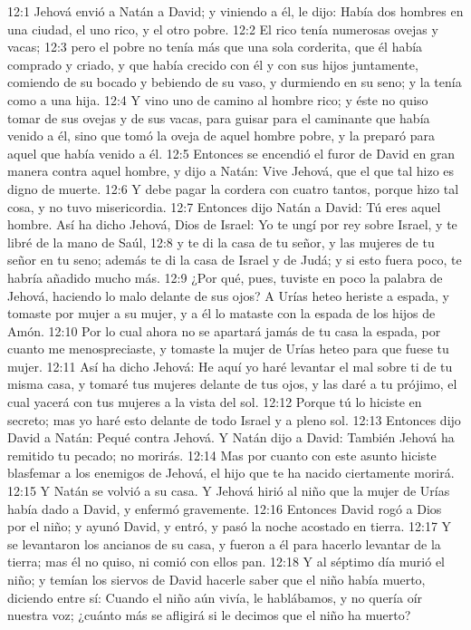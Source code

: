 12:1 Jehová envió a Natán a David; y viniendo a él, le dijo: Había dos hombres en una ciudad, el uno rico, y el otro pobre.  
12:2 El rico tenía numerosas ovejas y vacas;  
12:3 pero el pobre no tenía más que una sola corderita, que él había comprado y criado, y que había crecido con él y con sus hijos juntamente, comiendo de su bocado y bebiendo de su vaso, y durmiendo en su seno; y la tenía como a una hija.  
12:4 Y vino uno de camino al hombre rico; y éste no quiso tomar de sus ovejas y de sus vacas, para guisar para el caminante que había venido a él, sino que tomó la oveja de aquel hombre pobre, y la preparó para aquel que había venido a él.  
12:5 Entonces se encendió el furor de David en gran manera contra aquel hombre, y dijo a Natán: Vive Jehová, que el que tal hizo es digno de muerte.  
12:6 Y debe pagar la cordera con cuatro tantos, porque hizo tal cosa, y no tuvo misericordia.  
12:7 Entonces dijo Natán a David: Tú eres aquel hombre. Así ha dicho Jehová, Dios de Israel: Yo te ungí por rey sobre Israel, y te libré de la mano de Saúl,  
12:8 y te di la casa de tu señor, y las mujeres de tu señor en tu seno; además te di la casa de Israel y de Judá; y si esto fuera poco, te habría añadido mucho más.  
12:9 ¿Por qué, pues, tuviste en poco la palabra de Jehová, haciendo lo malo delante de sus ojos? A Urías heteo heriste a espada, y tomaste por mujer a su mujer, y a él lo mataste con la espada de los hijos de Amón.  
12:10 Por lo cual ahora no se apartará jamás de tu casa la espada, por cuanto me menospreciaste, y tomaste la mujer de Urías heteo para que fuese tu mujer.  
12:11 Así ha dicho Jehová: He aquí yo haré levantar el mal sobre ti de tu misma casa, y tomaré tus mujeres delante de tus ojos, y las daré a tu prójimo, el cual yacerá con tus mujeres a la vista del sol.  
12:12 Porque tú lo hiciste en secreto; mas yo haré esto delante de todo Israel y a pleno sol. 
12:13 Entonces dijo David a Natán: Pequé contra Jehová. Y Natán dijo a David: También Jehová ha remitido tu pecado; no morirás.  
12:14 Mas por cuanto con este asunto hiciste blasfemar a los enemigos de Jehová, el hijo que te ha nacido ciertamente morirá.  
12:15 Y Natán se volvió a su casa. Y Jehová hirió al niño que la mujer de Urías había dado a David, y enfermó gravemente.  
12:16 Entonces David rogó a Dios por el niño; y ayunó David, y entró, y pasó la noche acostado en tierra.  
12:17 Y se levantaron los ancianos de su casa, y fueron a él para hacerlo levantar de la tierra; mas él no quiso, ni comió con ellos pan.  
12:18 Y al séptimo día murió el niño; y temían los siervos de David hacerle saber que el niño había muerto, diciendo entre sí: Cuando el niño aún vivía, le hablábamos, y no quería oír nuestra voz; ¿cuánto más se afligirá si le decimos que el niño ha muerto?  
